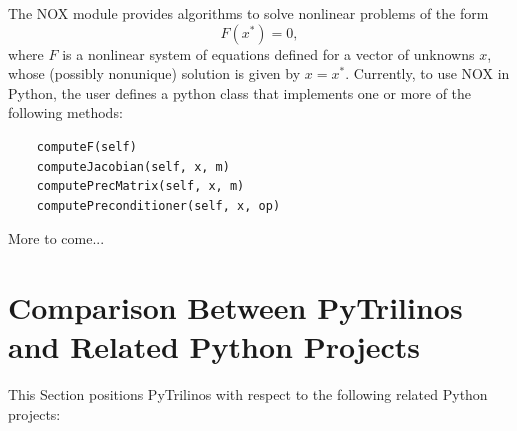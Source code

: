 \documentclass[acmtocl]{acmtrans2m}
\begin{document}
The NOX module provides algorithms to solve nonlinear problems of the
form
\begin{equation}
  F(x^*) = 0,
\end{equation}
where $F$ is a nonlinear system of equations defined for a vector of
unknowns $x$, whose (possibly nonunique) solution is given by
$x=x^*$.  Currently, to use NOX in Python, the user defines a python
class that implements one or more of the following methods:
\begin{verbatim}
    computeF(self)
    computeJacobian(self, x, m)
    computePrecMatrix(self, x, m)
    computePreconditioner(self, x, op)
\end{verbatim}
More to come...

\section{Comparison Between PyTrilinos and Related Python Projects}
\label{sec:comparison_python}

This Section positions PyTrilinos with respect to the following related
Python projects:
\end{document}
